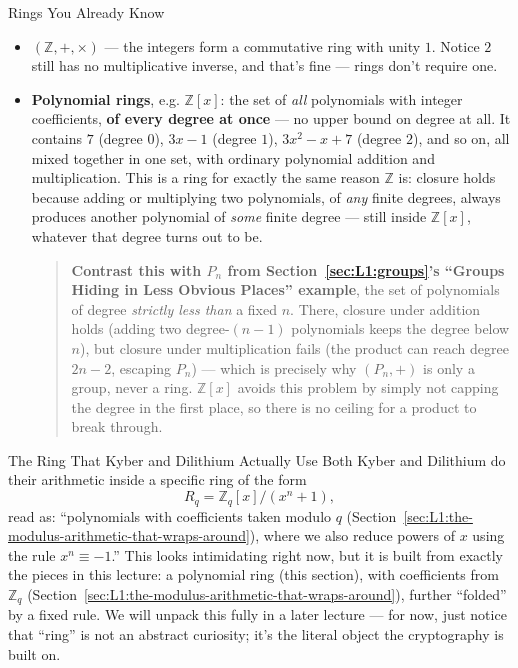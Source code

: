 \begin{exbox}{Rings You Already Know}
\begin{itemize}[leftmargin=*]
  \item $(\mathbb{Z}, +, \times)$ --- the integers form a commutative ring with unity $1$. Notice $2$ still has no multiplicative inverse, and that's fine --- rings don't require one.
  \item \textbf{Polynomial rings}, e.g. $\mathbb{Z}[x]$: the set of \emph{all} polynomials with integer coefficients, \textbf{of every degree at once} --- no upper bound on degree at all. It contains $7$ (degree $0$), $3x-1$ (degree $1$), $3x^2-x+7$ (degree $2$), and so on, all mixed together in one set, with ordinary polynomial addition and multiplication. This is a ring for exactly the same reason $\mathbb{Z}$ is: closure holds because adding or multiplying two polynomials, of \emph{any} finite degrees, always produces another polynomial of \emph{some} finite degree --- still inside $\mathbb{Z}[x]$, whatever that degree turns out to be.
  \begin{quote}\small\textbf{Contrast this with $P_n$ from Section~\ref{sec:L1:groups}'s ``Groups Hiding in Less Obvious Places'' example}, the set of polynomials of degree \emph{strictly less than} a fixed $n$. There, closure under addition holds (adding two degree-$(n{-}1)$ polynomials keeps the degree below $n$), but closure under multiplication fails (the product can reach degree $2n-2$, escaping $P_n$) --- which is precisely why $(P_n,+)$ is only a group, never a ring. $\mathbb{Z}[x]$ avoids this problem by simply not capping the degree in the first place, so there is no ceiling for a product to break through.\end{quote}
\end{itemize}
\end{exbox}

\begin{previewbox}{The Ring That Kyber and Dilithium Actually Use}
Both Kyber and Dilithium do their arithmetic inside a specific ring of the form
$$R_q = \mathbb{Z}_q[x] / (x^n + 1),$$
read as: ``polynomials with coefficients taken modulo $q$ (Section~\ref{sec:L1:the-modulus-arithmetic-that-wraps-around}), where we also reduce powers of $x$ using the rule $x^n \equiv -1$.'' This looks intimidating right now, but it is built from exactly the pieces in this lecture: a polynomial ring (this section), with coefficients from $\mathbb{Z}_q$ (Section~\ref{sec:L1:the-modulus-arithmetic-that-wraps-around}), further ``folded'' by a fixed rule. We will unpack this fully in a later lecture --- for now, just notice that ``ring'' is not an abstract curiosity; it's the literal object the cryptography is built on.
\end{previewbox}


